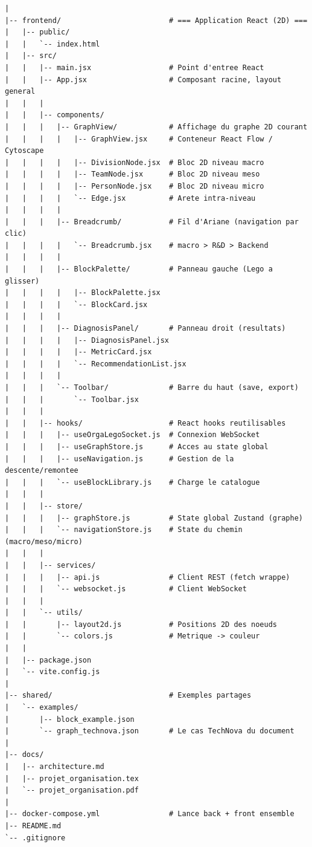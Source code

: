 \documentclass[11pt,a4paper]{article}
\begin{document}
\begin{lstlisting}[style=treestyle]
|
|-- frontend/                         # === Application React (2D) ===
|   |-- public/
|   |   `-- index.html
|   |-- src/
|   |   |-- main.jsx                  # Point d'entree React
|   |   |-- App.jsx                   # Composant racine, layout general
|   |   |
|   |   |-- components/
|   |   |   |-- GraphView/            # Affichage du graphe 2D courant
|   |   |   |   |-- GraphView.jsx     # Conteneur React Flow / Cytoscape
|   |   |   |   |-- DivisionNode.jsx  # Bloc 2D niveau macro
|   |   |   |   |-- TeamNode.jsx      # Bloc 2D niveau meso
|   |   |   |   |-- PersonNode.jsx    # Bloc 2D niveau micro
|   |   |   |   `-- Edge.jsx          # Arete intra-niveau
|   |   |   |
|   |   |   |-- Breadcrumb/           # Fil d'Ariane (navigation par clic)
|   |   |   |   `-- Breadcrumb.jsx    # macro > R&D > Backend
|   |   |   |
|   |   |   |-- BlockPalette/         # Panneau gauche (Lego a glisser)
|   |   |   |   |-- BlockPalette.jsx
|   |   |   |   `-- BlockCard.jsx
|   |   |   |
|   |   |   |-- DiagnosisPanel/       # Panneau droit (resultats)
|   |   |   |   |-- DiagnosisPanel.jsx
|   |   |   |   |-- MetricCard.jsx
|   |   |   |   `-- RecommendationList.jsx
|   |   |   |
|   |   |   `-- Toolbar/              # Barre du haut (save, export)
|   |   |       `-- Toolbar.jsx
|   |   |
|   |   |-- hooks/                    # React hooks reutilisables
|   |   |   |-- useOrgaLegoSocket.js  # Connexion WebSocket
|   |   |   |-- useGraphStore.js      # Acces au state global
|   |   |   |-- useNavigation.js      # Gestion de la descente/remontee
|   |   |   `-- useBlockLibrary.js    # Charge le catalogue
|   |   |
|   |   |-- store/
|   |   |   |-- graphStore.js         # State global Zustand (graphe)
|   |   |   `-- navigationStore.js    # State du chemin (macro/meso/micro)
|   |   |
|   |   |-- services/
|   |   |   |-- api.js                # Client REST (fetch wrappe)
|   |   |   `-- websocket.js          # Client WebSocket
|   |   |
|   |   `-- utils/
|   |       |-- layout2d.js           # Positions 2D des noeuds
|   |       `-- colors.js             # Metrique -> couleur
|   |
|   |-- package.json
|   `-- vite.config.js
|
|-- shared/                           # Exemples partages
|   `-- examples/
|       |-- block_example.json
|       `-- graph_technova.json       # Le cas TechNova du document
|
|-- docs/
|   |-- architecture.md
|   |-- projet_organisation.tex
|   `-- projet_organisation.pdf
|
|-- docker-compose.yml                # Lance back + front ensemble
|-- README.md
`-- .gitignore
\end{lstlisting}
\end{document}
